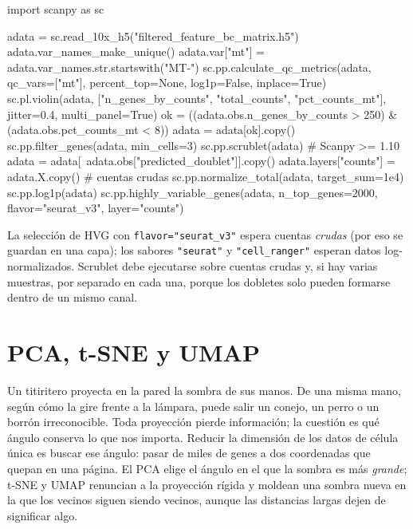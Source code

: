 \begin{codigo}[qc\_normalizacion.py]
import scanpy as sc

adata = sc.read_10x_h5("filtered_feature_bc_matrix.h5")
adata.var_names_make_unique()
adata.var["mt"] = adata.var_names.str.startswith("MT-")
sc.pp.calculate_qc_metrics(adata, qc_vars=["mt"],
                           percent_top=None, log1p=False,
                           inplace=True)
sc.pl.violin(adata, ["n_genes_by_counts", "total_counts",
                     "pct_counts_mt"], jitter=0.4, multi_panel=True)
ok = ((adata.obs.n_genes_by_counts > 250)
      & (adata.obs.pct_counts_mt < 8))
adata = adata[ok].copy()
sc.pp.filter_genes(adata, min_cells=3)
sc.pp.scrublet(adata)                    # Scanpy >= 1.10
adata = adata[~adata.obs["predicted_doublet"]].copy()
adata.layers["counts"] = adata.X.copy()  # cuentas crudas
sc.pp.normalize_total(adata, target_sum=1e4)
sc.pp.log1p(adata)
sc.pp.highly_variable_genes(adata, n_top_genes=2000,
                            flavor="seurat_v3", layer="counts")
\end{codigo}

\begin{cuidado}
La selección de HVG con \texttt{flavor="seurat\_v3"} espera cuentas \emph{crudas} (por eso se guardan en una capa); los sabores \texttt{"seurat"} y \texttt{"cell\_ranger"} esperan datos log-normalizados. Scrublet debe ejecutarse sobre cuentas crudas y, si hay varias muestras, por separado en cada una, porque los dobletes solo pueden formarse dentro de un mismo canal.
\end{cuidado}

\section{PCA, t-SNE y UMAP}\label{sec:12-reduccion}

\begin{intuicion}
Un titiritero proyecta en la pared la sombra de sus manos. De una misma mano, según cómo la gire frente a la lámpara, puede salir un conejo, un perro o un borrón irreconocible. Toda proyección pierde información; la cuestión es qué ángulo conserva lo que nos importa. Reducir la dimensión de los datos de célula única es buscar ese ángulo: pasar de miles de genes a dos coordenadas que quepan en una página. El PCA elige el ángulo en el que la sombra es más \emph{grande}; t-SNE y UMAP renuncian a la proyección rígida y moldean una sombra nueva en la que los vecinos siguen siendo vecinos, aunque las distancias largas dejen de significar algo.
\end{intuicion}

